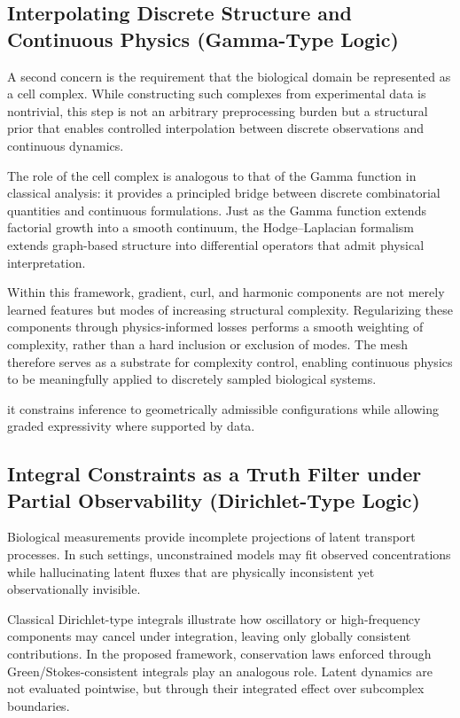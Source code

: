 \documentclass[10pt,article]{article}
\begin{document}
\subsection{Interpolating Discrete Structure and Continuous Physics (Gamma-Type Logic)}

A second concern is the requirement that the biological domain be represented as a cell complex. While constructing such complexes from experimental data is nontrivial, this step is not an arbitrary preprocessing burden but a structural prior that enables controlled interpolation between discrete observations and continuous dynamics.

The role of the cell complex is analogous to that of the Gamma function in classical analysis: it provides a principled bridge between discrete combinatorial quantities and continuous formulations. Just as the Gamma function extends factorial growth into a smooth continuum, the Hodge–Laplacian formalism extends graph-based structure into differential operators that admit physical interpretation.

Within this framework, gradient, curl, and harmonic components are not merely learned features but modes of increasing structural complexity. Regularizing these components through physics-informed losses performs a smooth weighting of complexity, rather than a hard inclusion or exclusion of modes. The mesh therefore serves as a substrate for complexity control, enabling continuous physics to be meaningfully applied to discretely sampled biological systems.

it constrains inference to geometrically admissible configurations while allowing graded expressivity where supported by data.

\subsection{Integral Constraints as a Truth Filter under Partial Observability (Dirichlet-Type Logic)}

Biological measurements provide incomplete projections of latent transport processes. In such settings, unconstrained models may fit observed concentrations while hallucinating latent fluxes that are physically inconsistent yet observationally invisible.

Classical Dirichlet-type integrals illustrate how oscillatory or high-frequency components may cancel under integration, leaving only globally consistent contributions. In the proposed framework, conservation laws enforced through Green/Stokes-consistent integrals play an analogous role. Latent dynamics are not evaluated pointwise, but through their integrated effect over subcomplex boundaries.
\end{document}
